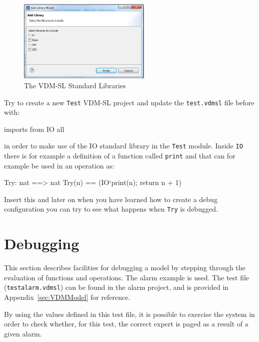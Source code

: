 \begin{figure}[!htb]
\begin{center}
  \includegraphics[width=2.5in]{figures/stdlibs}
  \caption[labelInTOC]{The VDM-SL Standard Libraries}
  \label{fig:stdlibs}
\end{center}
\end{figure}
%
\begin{myexercise}\label{ex:tb-error}
Try to create a new \texttt{Test} VDM-SL project and update the \texttt{test.vdmsl} file before {\bf{}} with:
%
\begin{vdmsl}
imports from IO all
\end{vdmsl}
%
in order to make use of the IO standard library in the \texttt{Test} module. Inside \texttt{IO} there is for example a definition of a function called \texttt{print} and that can for example be used in an
operation as: 
\begin{vdmsl}
Try: nat ==> nat
Try(n) ==
  (IO`print(n);
   return n + 1)
\end{vdmsl}
%
Insert this and later on when you have learned how to create a debug configuration you can try to see what happens when \texttt{Try} is debugged. 
\end{myexercise}
%
\section{Debugging}\label{sec:debugging}
This section describes facilities for debugging a model by stepping through the evaluation of functions and operations. The alarm example is used. The test file (\texttt{testalarm.vdmsl}) can be found in the alarm project, and is provided in Appendix~\ref{sec:VDMModel} for reference. 
%
%

By using the values defined in this test file, it is possible to exercise the system in order to check whether, for this test, the correct expert is paged as a result of a given alarm.
%
